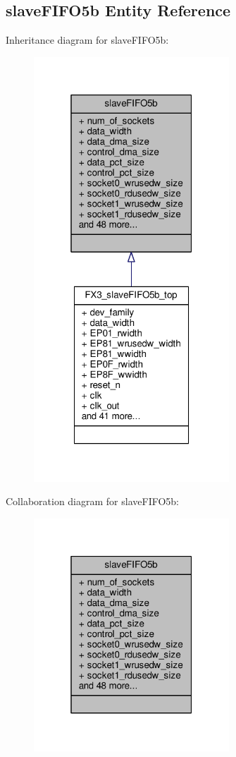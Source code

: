 \subsection{slave\+F\+I\+F\+O5b Entity Reference}
\label{classslaveFIFO5b}


Inheritance diagram for slave\+F\+I\+F\+O5b\+:\nopagebreak
\begin{figure}[H]
\begin{center}
\leavevmode
\includegraphics[width=208pt]{d3/d10/classslaveFIFO5b__inherit__graph}
\end{center}
\end{figure}


Collaboration diagram for slave\+F\+I\+F\+O5b\+:\nopagebreak
\begin{figure}[H]
\begin{center}
\leavevmode
\includegraphics[width=208pt]{d1/dda/classslaveFIFO5b__coll__graph}
\end{center}
\end{figure}
